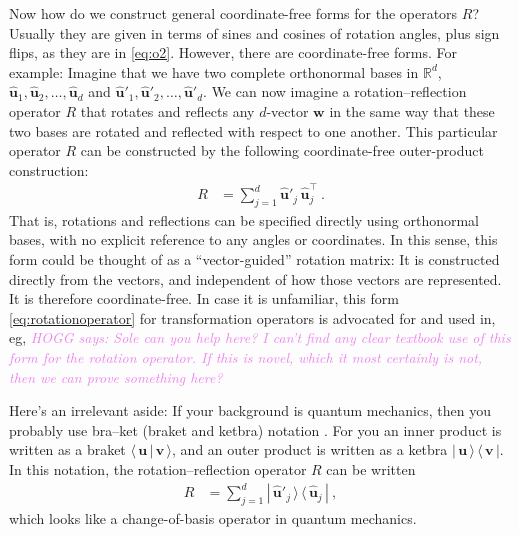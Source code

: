 \documentclass{article}
\newcommand{\Evec}[1]{{\mathbf{#1}}} %
\newcommand{\Ehat}[1]{{\mathbf{\hat{#1}}}} %
\newcommand{\braket}[2]{\langle\,{#1}\,|\,{#2}\,\rangle}
\newcommand{\ketbra}[2]{|\,{#1}\,\rangle\,\langle\,{#2}\,|}
\newcommand{\HOGG}[1]{\textcolor{violet}{\textsl{HOGG says: {#1}}}}
\begin{document}
Now how do we construct general coordinate-free forms for the operators $R$?
Usually they are given in terms of sines and cosines of rotation angles, plus sign flips, as they are in \eqref{eq:o2}.
However, there are coordinate-free forms.
For example: Imagine that we have two complete orthonormal bases in $\mathbb{R}^d$, $\Ehat{u}_1,\Ehat{u}_2,\ldots,\Ehat{u}_d$ and $\Ehat{u}'_1,\Ehat{u}'_2,\ldots,\Ehat{u}'_d$.
We can now imagine a rotation--reflection operator $R$ that rotates and reflects any $d$-vector $\Evec{w}$ in the same way that these two bases are rotated and reflected with respect to one another.
This particular operator $R$ can be constructed by the following coordinate-free outer-product construction:
\begin{align}
    R &= \sum_{j=1}^d \Ehat{u}'_j\,\Ehat{u}_j^\top ~.\label{eq:rotationoperator}
\end{align}
That is, rotations and reflections can be specified directly using orthonormal bases, with no explicit reference to any angles or coordinates.
In this sense, this form could be thought of as a ``vector-guided'' rotation matrix:
It is constructed directly from the vectors, and independent of how those vectors are represented.
It is therefore coordinate-free.
In case it is unfamiliar, this form \eqref{eq:rotationoperator} for transformation operators is advocated for and used in, eg, \HOGG{Sole can you help here? I can't find any clear textbook use of this form for the rotation operator. If this is novel, which it most certainly is not, then we can prove something here?}

Here's an irrelevant aside:
If your background is quantum mechanics, then you probably use bra--ket (braket and ketbra) notation \cite{dirac}.
For you an inner product is written as a braket $\braket{\Evec{u}}{\Evec{v}}$, and an outer product is written as a ketbra $\ketbra{\Evec{u}}{\Evec{v}}$.
In this notation, the rotation--reflection operator $R$ can be written 
\begin{align}
    R &= \sum_{j=1}^d \ketbra{\Ehat{u}'_j}{\Ehat{u}_j} ~,
\end{align}
which looks like a change-of-basis operator in quantum mechanics.
\end{document}
